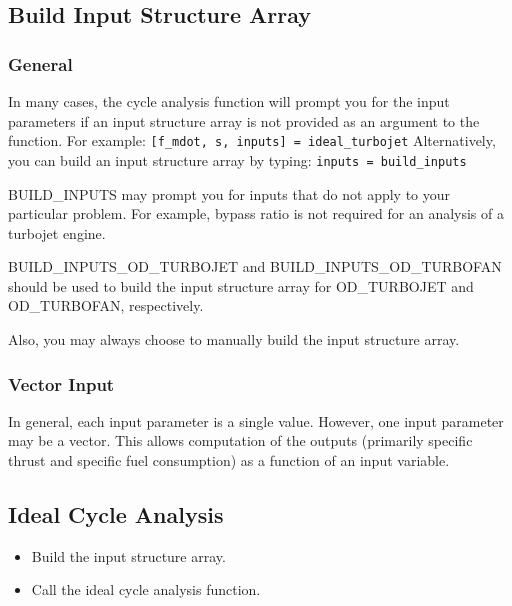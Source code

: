 \documentclass{article}
\begin{document}
\subsection{Build Input Structure Array}
\subsubsection{General}
In many cases, the cycle analysis function will prompt you for the
input parameters if an input structure array is not provided as an
argument to the function.  For example:
\newline
\newline
\texttt{[f\_mdot, s, inputs] = ideal\_turbojet}
\newline
\newline
Alternatively, you can build an input structure array by typing:
\newline
\newline
\texttt{inputs = build\_inputs}
\newline
\newline

BUILD\_INPUTS may prompt you for inputs that do not apply to your
particular problem.  For example, bypass ratio is not required for an
analysis of a turbojet engine.

BUILD\_INPUTS\_OD\_TURBOJET and BUILD\_INPUTS\_OD\_TURBOFAN should be
used to build the input structure array for OD\_TURBOJET and
OD\_TURBOFAN, respectively.

Also, you may always choose to manually build the input structure
array.

\subsubsection{Vector Input}
In general, each input parameter is a single value.  However, one
input parameter may be a vector.  This allows computation of the
outputs (primarily specific thrust and specific fuel consumption) as a
function of an input variable.

\subsection{Ideal Cycle Analysis}
\begin{itemize}
\item Build the input structure array.
\item Call the ideal cycle analysis function.
\end{itemize}
\end{document}
